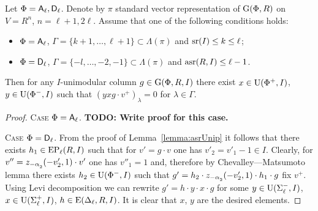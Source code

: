 \begin{lemma} \label{lemma:uraction} 
Let $\Phi=\mathsf{A}_\ell, \mathsf{D}_\ell$. Denote by $\pi$ standard vector representation of $\operatorname{G}(\Phi, R)$ on $V=R^n$, $n=\ell+1,2\ell$.
Assume that one of the following conditions holds:
\begin{itemize}
 \item $\Phi=\mathsf{A}_\ell$, $\Gamma=\{ k+1, \ldots, \ell+1\} \subset \Lambda(\pi)$ and $\operatorname{sr}(I)\leq k\leq \ell$;
 \item $\Phi=\mathsf{D}_\ell$, $\Gamma=\{-l,\ldots, -2, -1\} \subset \Lambda(\pi)$ and $\operatorname{asr}(R, I)\leq \ell-1$. 
\end{itemize}
Then for any $I$-unimodular column $g\in \operatorname{G}(\Phi, R, I)$ there exist $x\in \operatorname{U}(\Phi^+, I)$, $y\in \operatorname{U}(\Phi^-, I)$ such that $(yxg \cdot v^+)_\lambda = 0$ for $\lambda\in \Gamma$.
\end{lemma}
\begin{proof}
\textsc{Case $\Phi=\mathsf{A}_\ell$.} \textbf{TODO: Write proof for this case.}

\textsc{Case $\Phi=\mathsf{D}_\ell$.} From the proof of Lemma~\ref{lemma:asrUnip} it follows that there exists $h_1 \in \operatorname{EP}_\ell(R, I)$ such that for $v'=g\cdot v$ one has $v'_2=v'_1-1\in I$.
Clearly, for $v'' = z_{-\alpha\ssub{2}}(-v'_2, 1)\cdot v'$ one has $v''_1=1$ and, therefore by Chevalley---Matsumoto lemma there exists $h_2 \in \operatorname{U}(\Phi^-, I)$ such that 
$g'=h_2 \cdot z_{-\alpha\ssub{2}}(-v'_2, 1) \cdot h_1 \cdot g$ fix $v^+$. Using Levi decomposition we can rewrite $g'=h \cdot y \cdot x \cdot g$ for some $y\in\operatorname{U}(\Sigma^-_\ell, I)$, $x \in \operatorname{U}(\Sigma^+_\ell, I)$, $h\in\operatorname{E}(\Delta_\ell, R, I)$.
It is clear that $x$, $y$ are the desired elements.
\end{proof}